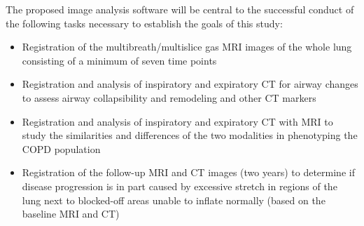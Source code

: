 \documentclass[11pt,]{article}
\begin{document}
The proposed image analysis software will be central to the successful
conduct of the following tasks necessary to establish the goals of this
study:

\begin{itemize}
\itemsep1pt\parskip0pt
\item
  Registration of the multibreath/multislice gas MRI images of the whole
  lung consisting of a minimum of seven time points
\item
  Registration and analysis of inspiratory and expiratory CT for airway
  changes to assess airway collapsibility and remodeling and other CT
  markers
\item
  Registration and analysis of inspiratory and expiratory CT with MRI to
  study the similarities and differences of the two modalities in
  phenotyping the COPD population
\item
  Registration of the follow-up MRI and CT images (two years) to
  determine if disease progression is in part caused by excessive
  stretch in regions of the lung next to blocked-off areas unable to
  inflate normally (based on the baseline MRI and CT)
\end{itemize}
\end{document}
